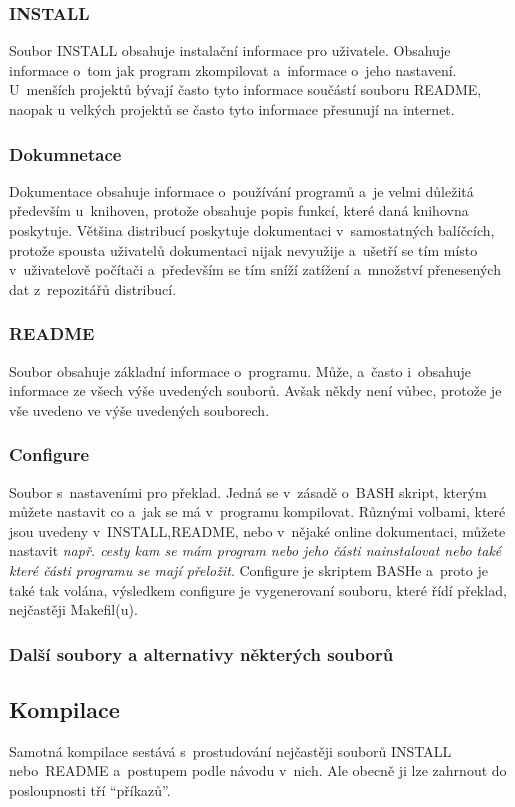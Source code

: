 \documentclass[a4paper,12pt]{article}
\renewcommand{\it}[1]{\textit{#1}}		%
\begin{document}
\subsubsection{INSTALL}
Soubor INSTALL obsahuje instalační informace pro uživatele. Obsahuje informace o~tom jak program zkompilovat a~informace o~jeho nastavení. U~menších projektů bývají často tyto informace součástí souboru README, naopak u velkých projektů se často tyto informace přesunují na internet.
\subsubsection{Dokumnetace}
Dokumentace obsahuje informace o~používání programů a~je velmi důležitá především u~knihoven, protože obsahuje popis funkcí, které daná knihovna poskytuje. Většina distribucí poskytuje dokumentaci v~samostatných balíčcích, protože spousta uživatelů dokumentaci nijak nevyužije a~ušetří se tím místo v~uživatelově počítači a~především se tím sníží zatížení a~množství přenesených dat z~repozitářů distribucí.
\subsubsection{README}
Soubor obsahuje základní informace o~programu. Může, a~často i~obsahuje informace ze všech výše uvedených souborů. Avšak někdy není vůbec, protože je vše uvedeno ve výše uvedených souborech.
\subsubsection{Configure}
Soubor s~nastaveními pro překlad. Jedná se v~zásadě o~BASH skript, kterým můžete nastavit co a~jak se má v~programu kompilovat. Různými volbami, které jsou uvedeny v~INSTALL,README, nebo v~nějaké online dokumentaci, můžete nastavit \it{např. cesty kam se mám program nebo jeho části nainstalovat nebo také které části programu se mají přeložit}. Configure je skriptem BASHe a~proto je také tak volána, výsledkem configure je vygenerovaní souboru, které řídí překlad, nejčastěji Makefil(u).
\subsubsection{Další soubory a alternativy některých souborů}

\subsection{Kompilace}
Samotná kompilace sestává s~prostudování nejčastěji souborů INSTALL nebo README a~postupem podle návodu v~nich. Ale obecně ji lze zahrnout do posloupnosti tří ``příkazů''.
\end{document}
